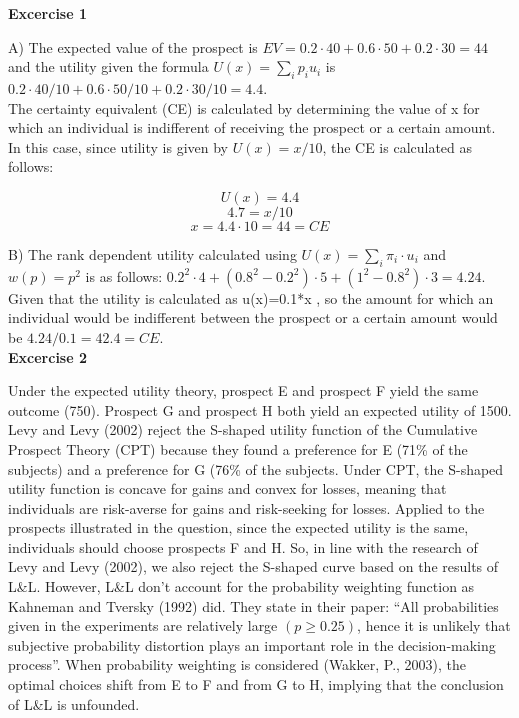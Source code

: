 \documentclass[11pt]{article}
\begin{document}
	
	
	{}

	
	\textbf {Excercise 1\\}
	
	A) 	The expected value of the prospect is $EV=0.2\cdot 40+0.6\cdot 50+0.2\cdot 30=44$ and the utility given the formula  $U(x)= \sum_{i} p_i u_i$ is $0.2\cdot 40/10 + 0.6\cdot  50/10 + 0.2\cdot  30/10 = 4.4$.\\
	The certainty equivalent (CE) is calculated by determining the value of x for which an individual is indifferent of receiving the prospect or a certain amount. In this case, since utility is given by $U(x)= x/10$, the CE is calculated as follows:
	
	\[U(x)=4.4\]
	\[4.7=  x/10\]
	\[x= 4.4\cdot 10=44=CE\]
	
	B) 	The rank dependent utility calculated using $U(x)= \sum_{i} \pi_{i} \cdot u_{i}$ and $w(p)= p^2$ is as follows: $0.2^2 \cdot 4+(0.8^2-0.2^2)\cdot 5+(1^2-0.8^2)\cdot 3=4.24$.\\
	Given that the utility is calculated as u(x)=0.1*x , so the amount for which an individual would be indifferent between the prospect or a certain amount would be $4.24/0.1=42.4=CE$.\\
	
	
	\textbf {Excercise 2\\}
	
	Under the expected utility theory, prospect E and prospect F yield the same outcome (750). Prospect G and prospect H both yield an expected utility of 1500. Levy and Levy (2002) reject the S-shaped utility function of the Cumulative Prospect Theory (CPT) because they found a preference for E (71\% of the subjects) and a preference for G (76\% of the subjects. Under CPT, the S-shaped utility function is concave for gains and convex for losses, meaning that individuals are risk-averse for gains and risk-seeking for losses. Applied to the prospects illustrated in the question, since the expected utility is the same, individuals should choose prospects F and H. So, in line with the research of Levy and Levy (2002), we also reject the S-shaped curve based on the results of L\&L. However, L\&L don’t account for the probability weighting function as Kahneman and Tversky (1992) did. They state in their paper: “All probabilities given in the experiments are relatively large $(p ≥ 0.25)$, hence it is unlikely that subjective probability distortion plays an important role in the decision-making process”. When probability weighting is considered (Wakker, P., 2003), the optimal choices shift from E to F and from G to H, implying that the conclusion of L\&L is unfounded. \\
		
\end{document}

